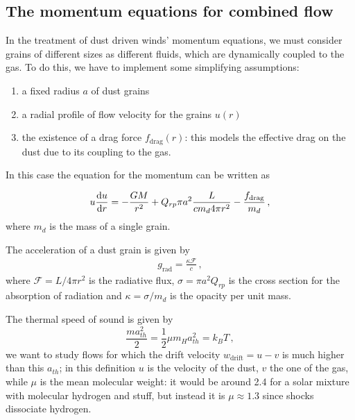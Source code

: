 \documentclass[main.tex]{subfiles}
\begin{document}


\subsection{The momentum equations for combined flow}

In the treatment of dust driven winds' momentum equations, we must consider grains of different sizes as different fluids, which are dynamically coupled to the gas.
To do this, we have to implement some simplifying assumptions:
\begin{enumerate}
    \item a fixed radius $a$ of dust grains
    \item a radial profile of flow velocity for the grains $u(r)$
    \item the existence of a drag force $f_{\text{drag}}(r)$: this models the effective drag on the dust due to its coupling to the gas.
\end{enumerate}

In this case the equation for the momentum can be written as

\begin{equation}
u \dv{u}{r} = -\frac{GM}{r^2}+Q_{rp}\pi a^2 \frac{L}{c m_d 4\pi r^2}-\frac{f_{\text{drag}}}{m_d}
\,,
\end{equation}
%
where \(m_d\) is the mass of a single grain. 

The acceleration of a dust grain is given by 
%
\begin{align}
g _{\text{rad}} = \frac{\kappa \mathscr{F}}{c}
\,,
\end{align}
%
where \(\mathscr{F} = L / 4 \pi r^2\) is the radiative flux, \(\sigma = \pi a^2 Q_{rp}\) is the cross section for the absorption of radiation and \(\kappa = \sigma / m_d\) is the opacity per unit mass.

The thermal speed of sound is given by
\begin{equation}
\frac{m a_{th}^2}{2} = \frac{1}{2} \mu m_H a^2_{th} =k_B T
\,,
\end{equation}
we want to study flows for which the drift velocity $w_{\text{drift}}=u-v$ is much higher than this $a_{th}$; in this definition
\(u\) is the velocity of the dust, \(v\) the one of the gas, while \(\mu \) is the mean molecular weight: it would be around \num{2.4} for a solar mixture with molecular hydrogen and stuff, but instead it is 
\(\mu \approx \num{1.3}\) since shocks dissociate hydrogen.
\end{document}
